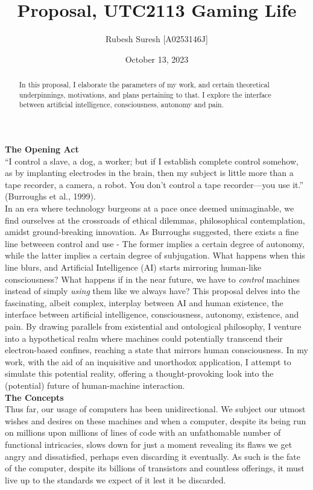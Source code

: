\documentclass[11pt]{article}
\title{Proposal, UTC2113 Gaming Life}
\author{Rubesh Suresh [A0253146J]}
\date {October 13, 2023}
\begin{document}
\maketitle

\begin{abstract}
In this proposal, I elaborate the parameters of my work, and certain theoretical underpinnings, motivations, and plans pertaining to that. I explore the interface between artificial intelligence, consciousness, autonomy and pain. \\
\end{abstract}

\textbf{\Large The Opening Act} \\

“I control a slave, a dog, a worker; but if I establish complete control somehow, as by implanting electrodes in the brain, then my subject is little more than a tape recorder, a camera, a robot. You don’t control a tape recorder—you use it.” (Burroughs et al., 1999). \\

In an era where technology burgeons at a pace once deemed unimaginable, we find ourselves at the crossroads of ethical dilemmas, philosophical contemplation, amidst ground-breaking innovation. As Burroughs suggested, there exists a fine line betweeen control and use - The former implies a certain degree of autonomy, while the latter implies a certain degree of subjugation. What happens when this line blurs, and Artificial Intelligence (AI) starts mirroring human-like consciousness? What happens if in the near future, we have to \textit{control} machines instead of simply \textit{using} them like we always have? This proposal delves into the fascinating, albeit complex, interplay between AI and human existence, the interface between artificial intelligence, consciousness, autonomy, existence, and pain. By drawing parallels from existential and ontological philosophy, I venture into a hypothetical realm where machines could potentially transcend their electron-based confines, reaching a state that mirrors human consciousness. In my work, with the aid of an inquisitive and unorthodox application, I attempt to simulate this potential reality, offering a thought-provoking look into the (potential) future of human-machine interaction. \\

\textbf{\Large The Concepts} \\

Thus far, our usage of computers has been unidirectional. We subject our utmost wishes and desires on these machines and when a computer, despite its being run on millions upon millions of lines of code with an unfathomable number of functional intricacies, slows down for just a moment revealing its flaws we get angry and dissatisfied, perhaps even discarding it eventually. As such is the fate of the computer, despite its billions of transistors and countless offerings, it must live up to the standards we expect of it lest it be discarded. \\
\end{document}
